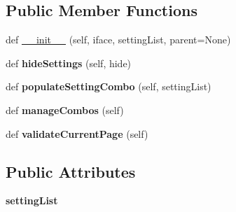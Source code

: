 \subsection*{Public Member Functions}
\begin{DoxyCompactItemize}
\item 
def \mbox{\hyperlink{class_dsg_tools_1_1_custom_widgets_1_1select_task_wizard_1_1_select_task_wizard_a993df0d568b8e21d3fb2e24d3940081e}{\+\_\+\+\_\+init\+\_\+\+\_\+}} (self, iface, setting\+List, parent=None)
\item 
\mbox{\label{class_dsg_tools_1_1_custom_widgets_1_1select_task_wizard_1_1_select_task_wizard_a00e2b2b458344f4b69889f0effb76dd1}} 
def {\bfseries hide\+Settings} (self, hide)
\item 
\mbox{\label{class_dsg_tools_1_1_custom_widgets_1_1select_task_wizard_1_1_select_task_wizard_a425488e423094b4f127abf04d79ed0a1}} 
def {\bfseries populate\+Setting\+Combo} (self, setting\+List)
\item 
\mbox{\label{class_dsg_tools_1_1_custom_widgets_1_1select_task_wizard_1_1_select_task_wizard_a6bc07817a43bb468dfa87afd6fb96b61}} 
def {\bfseries manage\+Combos} (self)
\item 
\mbox{\label{class_dsg_tools_1_1_custom_widgets_1_1select_task_wizard_1_1_select_task_wizard_a93a46f4df351ebbf5795f9b091fd9b82}} 
def {\bfseries validate\+Current\+Page} (self)
\end{DoxyCompactItemize}
\subsection*{Public Attributes}
\begin{DoxyCompactItemize}
\item 
\mbox{\label{class_dsg_tools_1_1_custom_widgets_1_1select_task_wizard_1_1_select_task_wizard_a734695ff5f5372c39ee7af84fa1a752a}} 
{\bfseries setting\+List}
\end{DoxyCompactItemize}
